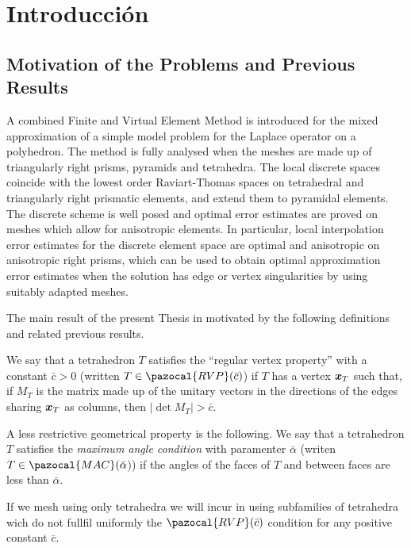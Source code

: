 \chapter*{Introducci\'on}
 
\section*{Motivation of the Problems and Previous Results} %

A combined Finite and Virtual Element Method is introduced for the 
mixed approximation of a 
simple model problem for the Laplace operator on a polyhedron. The 
method is fully analysed when the meshes are made up of triangularly
right prisms, pyramids and tetrahedra. The local discrete 
spaces coincide with the lowest order Raviart-Thomas 
spaces on tetrahedral and triangularly right prismatic elements, and 
extend them to pyramidal elements. The discrete scheme 
is well posed and optimal error estimates are proved on meshes which 
allow for anisotropic elements. In particular, local 
interpolation error estimates for the discrete element space are 
optimal and anisotropic on anisotropic right prisms, which can be
used to obtain optimal approximation error estimates when the 
solution has edge or vertex singularities by using suitably adapted meshes.   

The main result of the present Thesis in motivated by the following
definitions and related previous results.

We say that a tetrahedron $T$ satisfies the ``regular vertex property'' with a
constant $\bar{c} > 0$ (written $T\in \pazocal{RVP}(\bar c)$) if $T$ has
 a vertex $\boldsymbol{x}_T$ such that,
if $M_T$ is the matrix made up of the unitary vectors in the directions
of the edges sharing $\boldsymbol{x}_T$ as columns, then $|\det M_T| > \bar{c}$.

A less restrictive geometrical property is the following. 
 We say that a tetrahedron $T$ satisfies the  {\it maximum angle condition} with paramenter $\bar\alpha$
(writen $T\in\pazocal{MAC}(\bar\alpha$))  if the angles of the faces of 
$T$ and between faces are 
less than $\bar\alpha$. 

If we mesh using only tetrahedra we will incur in using subfamilies of tetrahedra
wich do not fullfil uniformly the $\pazocal{RVP}(\bar c)$ condition for any positive constant $\bar c$.

